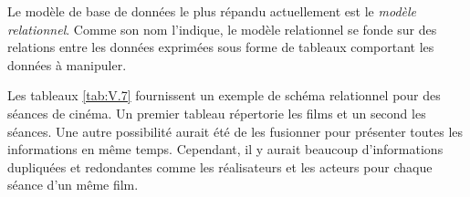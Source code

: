 Le modèle de base de données le plus répandu actuellement est le \emph{modèle relationnel}. Comme son nom l'indique, le modèle relationnel se fonde sur des relations entre les données exprimées sous forme de tableaux comportant les données à manipuler.

Les tableaux \ref{tab:V.7} fournissent un exemple de schéma relationnel pour des séances de cinéma. Un premier tableau répertorie les films et un second les séances. 
Une autre possibilité aurait été de les fusionner pour présenter toutes les informations en même temps. Cependant, il y aurait beaucoup d'informations dupliquées et redondantes comme les réalisateurs et les acteurs pour chaque séance d'un même film. 

